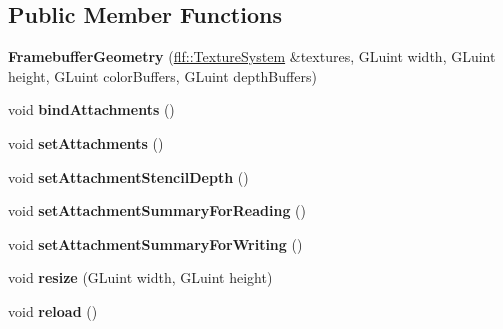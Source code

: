\subsection*{Public Member Functions}
\begin{DoxyCompactItemize}
\item 
\mbox{\label{classflw_1_1flc_1_1FramebufferGeometry_a73ef82a08dabc4ab9f22532739280a3a}} 
{\bfseries Framebuffer\+Geometry} (\hyperlink{classflw_1_1flf_1_1TextureSystem}{flf\+::\+Texture\+System} \&textures, G\+Luint width, G\+Luint height, G\+Luint color\+Buffers, G\+Luint depth\+Buffers)
\item 
\mbox{\label{classflw_1_1flc_1_1FramebufferGeometry_af50fc97cbd0dcaa71b0d1e394df904ff}} 
void {\bfseries bind\+Attachments} ()
\item 
\mbox{\label{classflw_1_1flc_1_1FramebufferGeometry_a2a6d3c1726f0ad74753754ff4ea93ee4}} 
void {\bfseries set\+Attachments} ()
\item 
\mbox{\label{classflw_1_1flc_1_1FramebufferGeometry_a4bf62a57889b708f77eca52019d2d329}} 
void {\bfseries set\+Attachment\+Stencil\+Depth} ()
\item 
\mbox{\label{classflw_1_1flc_1_1FramebufferGeometry_a6eb7626820ef3a809e2b991623a94371}} 
void {\bfseries set\+Attachment\+Summary\+For\+Reading} ()
\item 
\mbox{\label{classflw_1_1flc_1_1FramebufferGeometry_a87cd7514a43b439abf9600898e586cfe}} 
void {\bfseries set\+Attachment\+Summary\+For\+Writing} ()
\item 
\mbox{\label{classflw_1_1flc_1_1FramebufferGeometry_a63dd366139773a4fd028a9b8fb98f150}} 
void {\bfseries resize} (G\+Luint width, G\+Luint height)
\item 
\mbox{\label{classflw_1_1flc_1_1FramebufferGeometry_a7e1c50e4964c2d595ad344086239189d}} 
void {\bfseries reload} ()
\end{DoxyCompactItemize}
